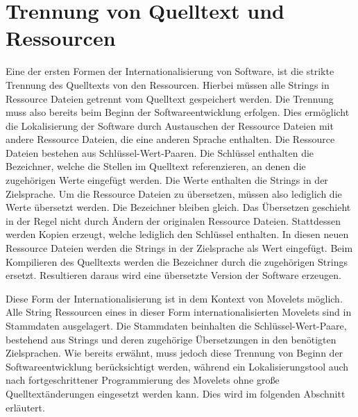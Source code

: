 \section{Trennung von Quelltext und Ressourcen}
Eine der ersten Formen der Internationalisierung von Software, ist die strikte Trennung des Quelltexts von den Ressourcen. Hierbei müssen alle Strings in Ressource Dateien getrennt vom Quelltext gespeichert werden. Die Trennung muss also bereits beim Beginn der Softwareentwicklung erfolgen. Dies ermöglicht die Lokalisierung der Software durch Austauschen der Ressource Dateien mit andere Ressource Dateien, die  eine anderen Sprache enthalten. Die Ressource Dateien bestehen aus Schlüssel-Wert-Paaren. Die Schlüssel enthalten die Bezeichner, welche die Stellen im Quelltext referenzieren, an denen die zugehörigen Werte eingefügt werden. Die Werte enthalten die Strings in der Zielsprache. Um die Ressource Dateien zu übersetzen, müssen also lediglich die Werte übersetzt werden. Die Bezeichner bleiben gleich. Das Übersetzen geschieht in der Regel nicht durch Ändern der originalen Ressource Dateien. Stattdessen werden Kopien erzeugt, welche lediglich den Schlüssel enthalten. In diesen neuen Ressource Dateien werden die Strings in der Zielsprache als Wert eingefügt. Beim Kompilieren des Quelltexts werden die Bezeichner durch die zugehörigen Strings ersetzt. Resultieren daraus wird eine übersetzte Version der Software erzeugen.
\autocite[Vgl.][S. 145]{Reineke.2005}
\par
Diese Form der Internationalisierung ist in dem Kontext von Movelets möglich. Alle String Ressourcen eines in dieser Form internationalisierten Movelets sind in Stammdaten ausgelagert. Die Stammdaten beinhalten die Schlüssel-Wert-Paare, bestehend aus Strings und deren zugehörige Übersetzungen in den benötigten Zielsprachen. Wie bereits erwähnt, muss jedoch diese Trennung von Beginn der Softwareentwicklung berücksichtigt werden, während ein Lokalisierungstool auch nach fortgeschrittener Programmierung des Movelets ohne große Quelltextänderungen eingesetzt werden kann. Dies wird im folgenden Abschnitt erläutert.